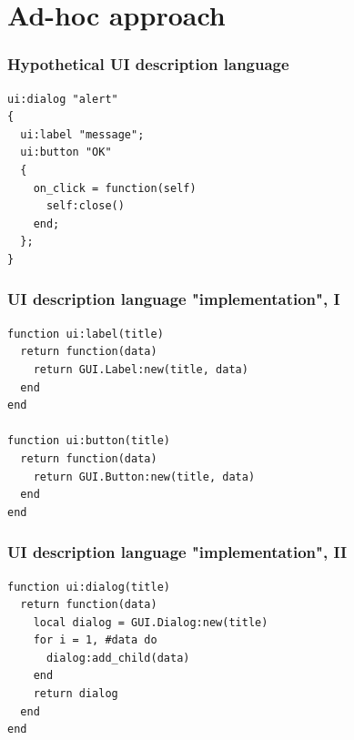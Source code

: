 \documentclass[handout]{beamer}
\begin{document}

\section{Ad-hoc approach}


\begin{frame}[fragile]

\frametitle{Hypothetical UI description language}

\begin{verbatim}
ui:dialog "alert"
{
  ui:label "message";
  ui:button "OK"
  {
    on_click = function(self)
      self:close()
    end;
  };
}
\end{verbatim}

\end{frame}


\begin{frame}[fragile]

\frametitle{UI description language "implementation", I}

\begin{verbatim}
function ui:label(title)
  return function(data)
    return GUI.Label:new(title, data)
  end
end

function ui:button(title)
  return function(data)
    return GUI.Button:new(title, data)
  end
end
\end{verbatim}

\end{frame}


\begin{frame}[fragile]

\frametitle{UI description language "implementation", II}

\begin{verbatim}
function ui:dialog(title)
  return function(data)
    local dialog = GUI.Dialog:new(title)
    for i = 1, #data do
      dialog:add_child(data)
    end
    return dialog
  end
end
\end{verbatim}

\end{frame}
\end{document}
